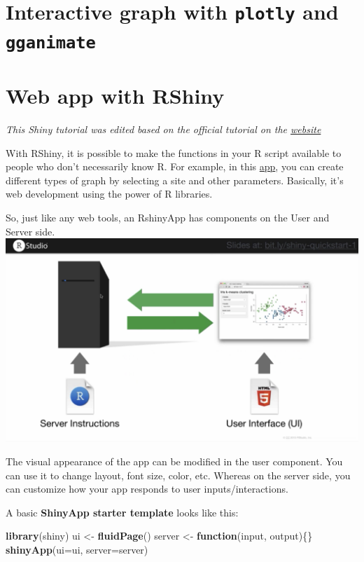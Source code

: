 \documentclass[
]{book}
\newenvironment{Shaded}{\begin{snugshade}}{\end{snugshade}}
\newcommand{\ControlFlowTok}[1]{\textcolor[rgb]{0.13,0.29,0.53}{\textbf{#1}}}
\newcommand{\DataTypeTok}[1]{\textcolor[rgb]{0.13,0.29,0.53}{#1}}
\newcommand{\KeywordTok}[1]{\textcolor[rgb]{0.13,0.29,0.53}{\textbf{#1}}}
\newcommand{\NormalTok}[1]{#1}
\newcommand{\StringTok}[1]{\textcolor[rgb]{0.31,0.60,0.02}{#1}}
\begin{document}
\hypertarget{interactive-graph-with-plotly-and-gganimate}{%
\section{\texorpdfstring{Interactive graph with \texttt{plotly} and \texttt{gganimate}}{Interactive graph with plotly and gganimate}}\label{interactive-graph-with-plotly-and-gganimate}}

\hypertarget{web-app-with-rshiny}{%
\section{Web app with RShiny}\label{web-app-with-rshiny}}

\emph{This Shiny tutorial was edited based on the official tutorial on the \href{https://shiny.rstudio.com/tutorial/}{website}}

With RShiny, it is possible to make the functions in your R script available to people who don't necessarily know R. For example, in this \href{https://udwq.shinyapps.io/lakeprofiledashboard/}{app}, you can create different types of graph by selecting a site and other parameters. Basically, it's web development using the power of R libraries.

So, just like any web tools, an RshinyApp has components on the User and Server side.
\includegraphics{images/appStructure.png}

The visual appearance of the app can be modified in the user component. You can use it to change layout, font size, color, etc. Whereas on the server side, you can customize how your app responds to user inputs/interactions.

A basic \textbf{ShinyApp starter template} looks like this:

\begin{Shaded}
\begin{Highlighting}[]
\KeywordTok{library}\NormalTok{(shiny)}
\NormalTok{ui \textless{}{-}}\StringTok{ }\KeywordTok{fluidPage}\NormalTok{()}
\NormalTok{server \textless{}{-}}\StringTok{ }\ControlFlowTok{function}\NormalTok{(input, output)\{\}}
\KeywordTok{shinyApp}\NormalTok{(}\DataTypeTok{ui=}\NormalTok{ui, }\DataTypeTok{server=}\NormalTok{server)}
\end{Highlighting}
\end{Shaded}
\end{document}
